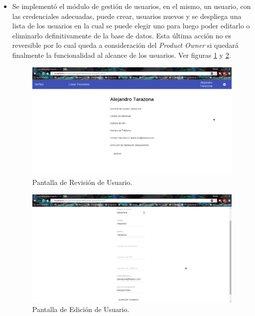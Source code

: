 \begin{enumerate}
\begin{itemize}
\begin{table}[h!]
                \caption{Artefactos de Maven: Autenticación}
                \label{artefactos-tba}
            \end{table}
            
            \item Se implementó el módulo de gestión de usuarios, en el mismo, un usuario, con las credenciales adecuadas, puede crear, usuarios nuevos y se despliega una lista de los usuarios en la  cual se puede elegir uno para luego poder editarlo o eliminarlo definitivamente de la base de datos. Esta última acción no es reversible por lo cual queda a consideración del \textit{Product Owner} si quedará finalmente la funcionalidad al alcance de los usuarios. Ver figuras \ref{Revisión} y \ref{Edición}.
            
            \begin{figure}[htbp!]
                \begin{center}
                    \includegraphics[width=.8\textwidth]{figures/p3}
                \end{center}
                \caption{Pantalla de Revisión de Usuario.}
                \label{Revisión}
            \end{figure}
            
            \begin{figure}[htbp!]
                \begin{center}
                    \includegraphics[width=.8\textwidth]{figures/p5}
                \end{center}
                \caption{Pantalla de Edición de Usuario.}
                \label{Edición}
            \end{figure}
            
        \end{itemize}
         

         
            
    \end{enumerate}
             
